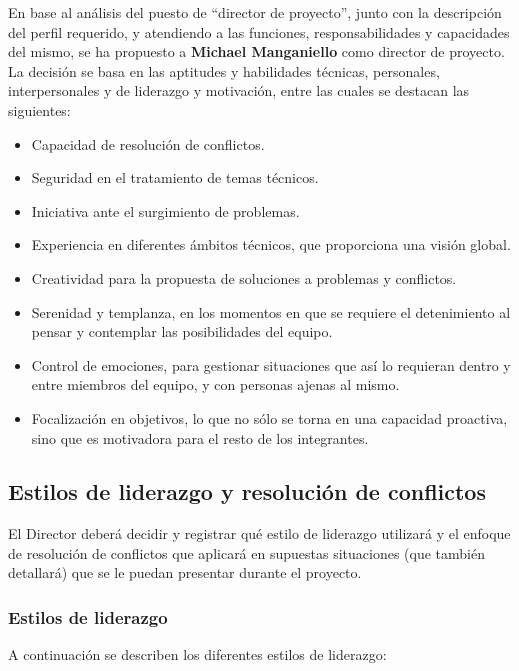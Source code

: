En base al análisis del puesto de ``director de proyecto'', junto con la descripción del perfil requerido, y atendiendo a las funciones, responsabilidades y capacidades del mismo, se ha propuesto a \textbf{Michael Manganiello} como director de proyecto.
La decisión se basa en las aptitudes y habilidades técnicas, personales, interpersonales y de liderazgo y motivación, entre las cuales se destacan las siguientes:

\begin{itemize}
    \item Capacidad de resolución de conflictos.
    \item Seguridad en el tratamiento de temas técnicos.
    \item Iniciativa ante el surgimiento de problemas.
    \item Experiencia en diferentes ámbitos técnicos, que proporciona una visión global.
    \item Creatividad para la propuesta de soluciones a problemas y conflictos.
    \item Serenidad y templanza, en los momentos en que se requiere el detenimiento al pensar y contemplar las posibilidades del equipo.
    \item Control de emociones, para gestionar situaciones que así lo requieran dentro y entre miembros del equipo, y con personas ajenas al mismo.
    \item Focalización en objetivos, lo que no sólo se torna en una capacidad proactiva, sino que es motivadora para el resto de los integrantes.
\end{itemize}

\newpage

\subsection{Estilos de liderazgo y resolución de conflictos}
El Director deberá decidir y registrar qué estilo de liderazgo utilizará y el enfoque de resolución de conflictos que aplicará en supuestas situaciones (que también detallará) que se le puedan presentar durante el proyecto.

\subsubsection{Estilos de liderazgo}

A continuación se describen los diferentes estilos de liderazgo:

